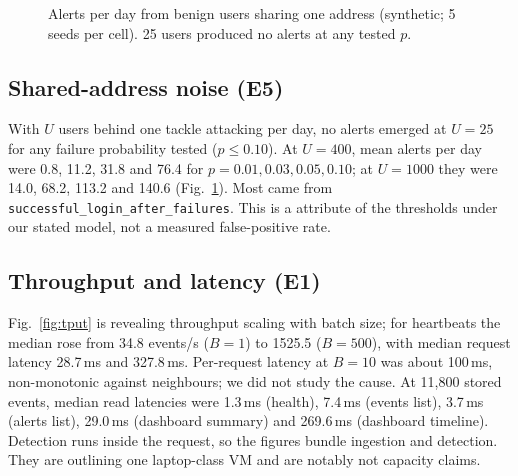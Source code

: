 \documentclass[conference]{IEEEtran}
\newcommand{\code}[1]{\texttt{#1}}
\begin{document}
\begin{figure}[t]
\centering
{}
\caption{Alerts per day from benign users sharing one address (synthetic; 5 seeds per cell). 25 users produced no alerts at any tested $p$.}
\label{fig:noise}
\end{figure}

\subsection{Shared-address noise (E5)}
With $U$ users behind one tackle attacking per day, no alerts emerged at $U=25$ for any failure probability tested ($p\leq 0.10$). At $U=400$, mean alerts per day were 0.8, 11.2, 31.8 and 76.4 for $p=0.01, 0.03, 0.05, 0.10$; at $U=1000$ they were 14.0, 68.2, 113.2 and 140.6 (Fig.~\ref{fig:noise}). Most came from \code{successful\_login\_after\_failures}. This is a attribute of the thresholds under our stated model, not a measured false-positive rate.

\subsection{Throughput and latency (E1)}
Fig.~\ref{fig:tput} is revealing throughput scaling with batch size; for heartbeats the median rose from 34.8 events/s ($B=1$) to 1525.5 ($B=500$), with median request latency 28.7\,ms and 327.8\,ms. Per-request latency at $B=10$ was about 100\,ms, non-monotonic against neighbours; we did not study the cause. At 11,800 stored events, median read latencies were 1.3\,ms (health), 7.4\,ms (events list), 3.7\,ms (alerts list), 29.0\,ms (dashboard summary) and 269.6\,ms (dashboard timeline). Detection runs inside the request, so the figures bundle ingestion and detection. They are outlining one laptop-class VM and are notably not capacity claims.
\end{document}
